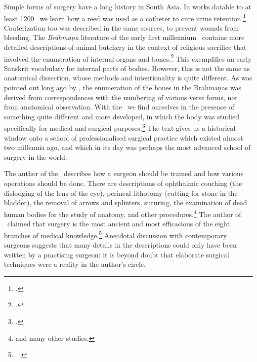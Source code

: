 Simple forms of surgery have a long history in South Asia. In works datable to at
least 1200 \BC\ we learn how a reed was used as a catheter to cure urine
retention.\footcite[70--71]{zysk-1985} Cauterization too was described in the 
same
sources, to prevent wounds from bleeding. The \emph{Brāhmaṇa} literature of 
the
early first millennium \BC\ contains more detailed descriptions of animal butchery
in the context of religious sacrifice that involved the enumeration of internal
organs and bones.\footcite{mala-1996,saha-2015}   This exemplifies an early
Sanskrit vocabulary for internal parts of bodies.  However, this is not the same
as anatomical dissection, whose methods and intentionality is quite different. As
was pointed out long ago by \citet{keit-1908}, the enumeration of the bones in the
Brāhmaṇas was derived from correspondences with the numbering of various 
verse
forms, not from anatomical observation.  With the \SS\ we find ourselves in the
presence of something quite different and more developed, in which the body was
studied specifically for medical and surgical purposes.\footcite{zysk-1986} The
text gives us a historical window onto a school of professionalised surgical
practice which existed almost two millennia ago, and which in its day was perhaps
the most advanced school of surgery in the world.


The author of the \SS\ describes how a surgeon should be trained and how various
operations should be done.  There are descriptions of ophthalmic couching (the
dislodging of the lens of the eye), perineal lithotomy (cutting for stone in the
bladder), the removal of arrows and splinters, suturing, the examination of dead
human bodies for the study of anatomy, and other
procedures.\footnote{\cites{mukh-1913,desh-2000,nara-2011,wuja-2003,wils-1823}
 and
many other studies.} The author of \SS\ claimed that surgery is the most ancient
and most efficacious of the eight branches of medical knowledge.\footnote{\SS\
.} Anecdotal discussion with contemporary surgeons suggests 
that
many details in the descriptions could only have been written by a practising
surgeon: it is beyond doubt that elaborate surgical techniques were a reality in
the author's circle. %


